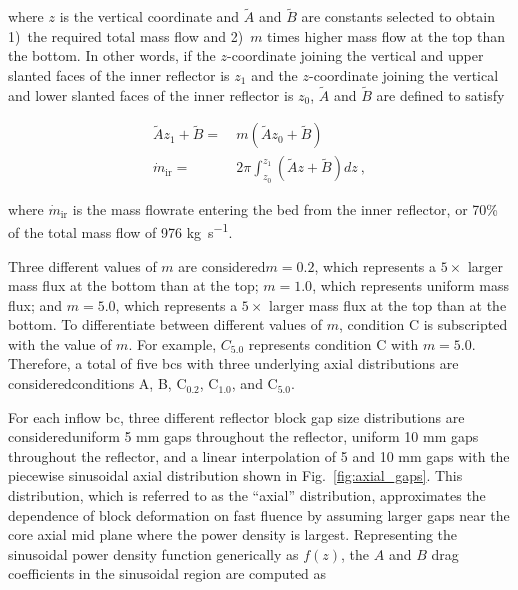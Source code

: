 \noindent where \(z\) is the vertical coordinate and \(\tilde{A}\) and \(\tilde{B}\) are constants selected to obtain 1)~the required total mass flow and 2)~\(m\) times higher mass flow at the top than the bottom. In other words, if the $z$-coordinate joining the vertical and upper slanted faces of the inner reflector is \(z_1\) and the $z$-coordinate joining the vertical and lower slanted faces of the inner reflector is \(z_0\), \(\tilde{A}\) and \(\tilde{B}\) are defined to satisfy

\begin{subequations}
\begin{align}
\label{eq:MFBC1}
\tilde{A}z_1+\tilde{B}=&\ m\left(\tilde{A}z_0+\tilde{B}\right)\\
\dot{m}_\text{ir}=&\ 2\pi\int_{z_0}^{z_1}\left(\tilde{A}z+\tilde{B}\right)dz\ ,
\end{align}
\end{subequations}

\noindent where \(\dot{m}_\text{ir}\) is the mass flowrate entering the bed from the inner reflector, or 70\% of the total mass flow of 976 \si{\kilo\gram\per\second}.

Three different values of \(m\) are considered\mdash \(m=0.2\), which represents a \(5\times\) larger mass flux at the bottom than at the top; \(m=1.0\), which represents uniform mass flux; and \(m=5.0\), which represents a \(5\times\) larger mass flux at the top than at the bottom. To differentiate between different values of \(m\), condition C is subscripted with the value of \(m\). For example, \(C_{5.0}\) represents condition C with \(m=5.0\). Therefore, a total of five \glspl{bc} with three underlying axial distributions are considered\mdash conditions A, B, C$_\text{0.2}$, C$_\text{1.0}$, and C$_\text{5.0}$.

For each inflow \gls{bc}, three different reflector block gap size distributions are considered\mdash uniform 5 \si{\milli\meter} gaps throughout the reflector, uniform 10 \si{\milli\meter} gaps throughout the reflector, and a linear interpolation of 5 and 10 \si{\milli\meter} gaps with the piecewise sinusoidal axial distribution shown in Fig.\ \ref{fig:axial_gaps}. This distribution, which is referred to as the ``axial'' distribution, approximates the dependence of block deformation on fast fluence by assuming larger gaps near the core axial mid plane where the power density is largest. Representing the sinusoidal power density function generically as \(f(z)\), the \(A\) and \(B\) drag coefficients in the sinusoidal region are computed as

